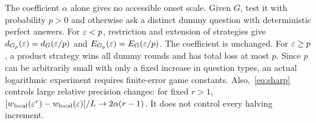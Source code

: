 The coefficient $\alpha$ alone gives no accessible onset scale. Given $G$, test it with probability $p>0$ and otherwise ask a distinct dummy question with deterministic perfect answers. For $\varepsilon<p$, restriction and extension of strategies give $d_{G_p}(\varepsilon)=d_G(\varepsilon/p)$ and $E_{G_p}(\varepsilon)=E_G(\varepsilon/p)$. The coefficient is unchanged. For $\varepsilon\ge p$, a product strategy wins all dummy rounds and has total loss at most $p$. Since $p$ can be arbitrarily small with only a fixed increase in question types, an actual logarithmic experiment requires finite-error game constants. Also,~\eqref{eq:sharp} controls large relative precision changes: for fixed $r>1$, $[w_{\rm local}(\varepsilon^r)-w_{\rm local}(\varepsilon)]/L\to2\alpha(r-1)$. It does not control every halving increment.
